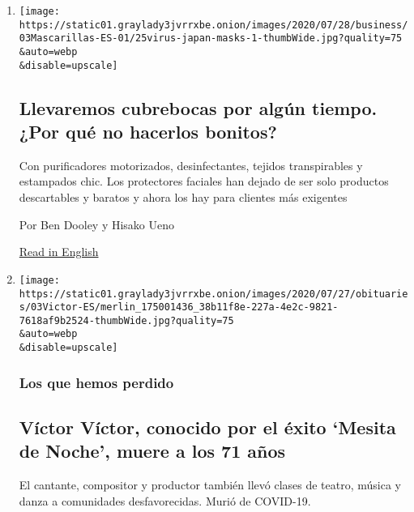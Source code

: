 \begin{enumerate}
\def\labelenumi{\arabic{enumi}.}
\item
  \href{/es/2020/08/04/espanol/negocios/japon-cubrebocas.html}{}

  \texttt{[image: https://static01.graylady3jvrrxbe.onion/images/2020/07/28/business/03Mascarillas-ES-01/25virus-japan-masks-1-thumbWide.jpg?quality=75\\\&auto=webp\\\&disable=upscale]}

  \hypertarget{llevaremos-cubrebocas-por-alguxfan-tiempo-por-quuxe9-no-hacerlos-bonitos}{%
  \subsection{Llevaremos cubrebocas por algún tiempo. ¿Por qué no
  hacerlos
  bonitos?}\label{llevaremos-cubrebocas-por-alguxfan-tiempo-por-quuxe9-no-hacerlos-bonitos}}

  Con purificadores motorizados, desinfectantes, tejidos transpirables y
  estampados chic. Los protectores faciales han dejado de ser solo
  productos descartables y baratos y ahora los hay para clientes más
  exigentes

  Por Ben Dooley y Hisako Ueno

  \href{https://www.nytimes3xbfgragh.onion/2020/07/27/business/fashion-masks-coronavirus.html}{Read
  in English}
\item
  \href{/es/2020/08/03/espanol/cultura/victor-victor-murio-coronavirus.html}{}

  \texttt{[image: https://static01.graylady3jvrrxbe.onion/images/2020/07/27/obituaries/03Victor-ES/merlin\_175001436\_38b11f8e-227a-4e2c-9821-7618af9b2524-thumbWide.jpg?quality=75\\\&auto=webp\\\&disable=upscale]}

  \hypertarget{los-que-hemos-perdido}{%
  \subsubsection{Los que hemos perdido}\label{los-que-hemos-perdido}}

  \hypertarget{vuxedctor-vuxedctor-conocido-por-el-uxe9xito-mesita-de-noche-muere-a-los-71-auxf1os}{%
  \subsection{Víctor Víctor, conocido por el éxito `Mesita de Noche',
  muere a los 71
  años}\label{vuxedctor-vuxedctor-conocido-por-el-uxe9xito-mesita-de-noche-muere-a-los-71-auxf1os}}

  El cantante, compositor y productor también llevó clases de teatro,
  música y danza a comunidades desfavorecidas. Murió de COVID-19.


\end{enumerate}
